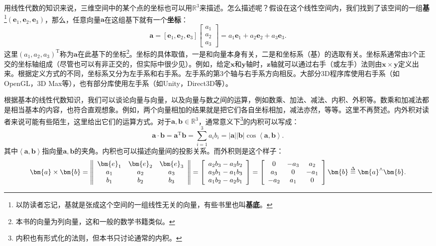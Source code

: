 用线性代数的知识来说，三维空间中的某个点的坐标也可以用$\mathbb{R}^3$来描述。怎么描述呢？假设在这个线性空间内，我们找到了该空间的一组\textbf{基}\footnote{以防读者忘记，基就是张成这个空间的一组线性无关的向量，有些书里也叫\textbf{基底}。}$(\bm{e}_1,\bm{e}_2,\bm{e}_3)$，那么，任意向量$\bm{a}$在这组基下就有一个\textbf{坐标}：
\begin{equation}
\bm{a} = \left[ {{\bm{e}_1},{\bm{e}_2},{\bm{e}_3}} \right]\left[ \begin{array}{l}
{a_1}\\
{a_2}\\
{a_3}
\end{array} \right] = {a_1}{\bm{e}_1} + {a_2}{\bm{e}_2} + {a_3}{\bm{e}_3}.
\end{equation}
这里$(a_1,a_2,a_3)^\mathrm{T}$称为$\bm{a}$在此基下的坐标\footnote{本书的向量为列向量，这和一般的数学书籍类似。}。坐标的具体取值，一是和向量本身有关，二是和坐标系（基）的选取有关。坐标系通常由3个正交的坐标轴组成（尽管也可以有非正交的，但实际中很少见）。例如，给定$\bm{x}$和$\bm{y}$轴时，$\bm{z}$轴就可以通过右手（或左手）法则由$\bm{x} \times \bm{y}$定义出来。根据定义方式的不同，坐标系又分为左手系和右手系。左手系的第3个轴与右手系方向相反。大部分3D程序库使用右手系（如OpenGL，3D Max等），也有部分库使用左手系（如Unity，Direct3D等）。

根据基本的线性代数知识，我们可以谈论向量与向量，以及向量与数之间的运算，例如数乘、加法、减法、内积、外积等。数乘和加减法都是相当基本的内容，也符合直观想象。例如，两个向量相加的结果就是把它们各自坐标相加，减法亦然，等等。这里不再赘述。内外积对读者来说可能有些陌生，这里给出它们的运算方式。对于$\bm{a}, \bm{b} \in \mathbb{R}^3$，通常意义下\footnote{内积也有形式化的法则，但本书只讨论通常的内积。}的内积可以写成：
\begin{equation}
\bm{a} \cdot \bm{b} = { \bm{a}^\mathrm{T}}\bm{b} = \sum\limits_{i = 1}^3 {{a_i}{b_i}}  = \left| \bm{a} \right|\left| \bm{b} \right|\cos \left\langle {\bm{a},\bm{b}} \right\rangle .
\end{equation}
其中$\left\langle {\bm{a},\bm{b}} \right\rangle$指向量$\bm{a},\bm{b}$的夹角。内积也可以描述向量间的投影关系。而外积则是这个样子：
\begin{equation}
\label{eq:cross}
\bm{a} \times \bm{b} = \left\| {\begin{array}{*{20}{c}}
	\bm{e}_1 & \bm{e}_2 & \bm{e}_3 \\
	{{a_1}}&{{a_2}}&{{a_3}}\\
	{{b_1}}&{{b_2}}&{{b_3}}
	\end{array}} \right\| = \left[ \begin{array}{l}
{a_2}{b_3} - {a_3}{b_2}\\
{a_3}{b_1} - {a_1}{b_3}\\
{a_1}{b_2} - {a_2}{b_1}
\end{array} \right] = \left[ {\begin{array}{*{20}{c}}
	0&{ - {a_3}}&{{a_2}}\\
	{{a_3}}&0&{ - {a_1}}\\
	{ - {a_2}}&{{a_1}}&0
	\end{array}} \right] \bm{b} \buildrel \Delta \over = { \bm{a}^ \wedge } \bm{b}.
\end{equation}


